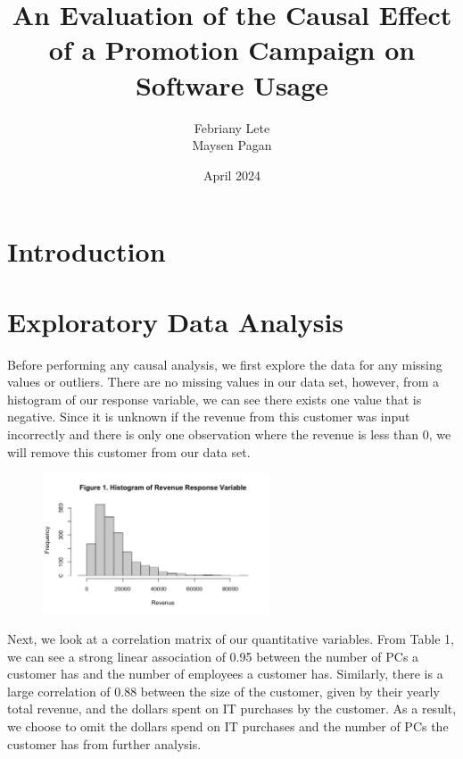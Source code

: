 \documentclass[10pt]{article}
\title{\textbf{An Evaluation of the Causal Effect of a Promotion Campaign on Software Usage}}
\author{Febriany Lete \\ Maysen Pagan}
\date{April 2024}
\begin{document}
\maketitle

\section{Introduction}
\section{Exploratory Data Analysis}

Before performing any causal analysis, we first explore the data for any missing values or outliers. There are no missing values in our data set, however, from a histogram of our response variable, we can see there exists one value that is negative. Since it is unknown if the revenue from this customer was input incorrectly and there is only one observation where the revenue is less than 0, we will remove this customer from our data set.

\begin{figure}[H]
  \centering
  \includegraphics[width = 0.6\textwidth]{figs/response_hist.png}
\end{figure}

Next, we look at a correlation matrix of our quantitative variables. From Table 1, we can see a strong linear association of 0.95 between the number of PCs a customer has and the number of employees a customer has. Similarly, there is a large correlation of 0.88 between the size of the customer, given by their yearly total revenue, and the dollars spent on IT purchases by the customer. As a result, we choose to omit the dollars spend on IT purchases and the number of PCs the customer has from further analysis. \\
\end{document}
